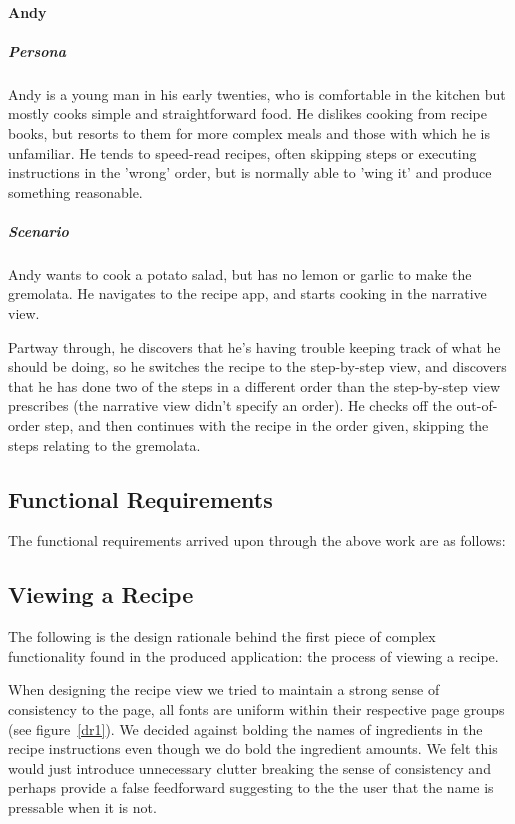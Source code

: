 \paragraph{Andy}
\subparagraph{Persona}
Andy is a young man in his early twenties, who is comfortable in the kitchen but
mostly cooks simple and straightforward food. He dislikes cooking from recipe
books, but resorts to them for more complex meals and those with which he is
unfamiliar. He tends to speed-read recipes, often skipping steps or executing
instructions in the 'wrong' order, but is normally able to 'wing it' and produce
something reasonable.
\subparagraph{Scenario}
Andy wants to cook a potato salad, but has no lemon or garlic to make the
gremolata. He navigates to the recipe app, and starts cooking in the narrative
view.

Partway through, he discovers that he's having trouble keeping track of what he
should be doing, so he switches the recipe to the step-by-step view, and
discovers that he has done two of the steps in a different order than the 
step-by-step view prescribes (the narrative view didn't specify an order). He
checks off the out-of-order step, and then continues with the recipe in the
order given, skipping the steps relating to the gremolata.

\subsection{Functional Requirements}
The functional requirements arrived upon through the above work are as follows:



\subsection{Viewing a Recipe}
The following is the design rationale behind the first piece of complex functionality found in the produced application: the process of viewing a recipe.

When designing the recipe view we tried to maintain a strong sense of consistency to the page, all fonts are uniform within their respective page groups (see figure~\ref{dr1}). We decided against bolding the names of ingredients in the recipe instructions even though we do bold the ingredient amounts. We felt this would just introduce unnecessary clutter breaking the sense of consistency and perhaps provide a false feedforward suggesting to the the user that the name is pressable when it is not.

